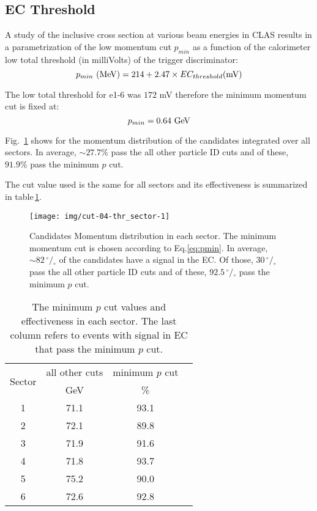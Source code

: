 \clearpage\newpage

\subsection{EC Threshold}
A study \cite{bib:ecmin} of the inclusive cross section at various beam energies in CLAS
results in a parametrization of the low momentum cut $p_{min}$ as a function of
the calorimeter low total threshold (in milliVolts) of the trigger discriminator:
\begin{equation}
    \label{eq:pmin}
    p_{min}\,\,{\rm (MeV)} = 214 + 2.47\times EC_{threshold}{\rm (mV)}
\end{equation}

The low total threshold for e1-6 was $172$ mV therefore the minimum momentum cut is fixed at:
$$
p_{min} = 0.64\,\,{\rm GeV}
$$

Fig.~\ref{fig:pmincut_alls} shows for the momentum distribution of the candidates integrated
over all sectors. In average, $\sim 27.7\%$  pass the all other particle ID
cuts and of these, $91.9\%$ pass the minimum $p$ cut.

The cut value used is the same for all sectors and its effectiveness is summarized in
table\,\ref{tab:pmincut}.


\begin{figure}[ht]
    \centering
    \texttt{[image: img/cut-04-thr\_sector-1]}
    \caption{Candidates Momentum distribution in each sector. The minimum momentum cut is
    chosen according to Eq.\ref{eq:pmin}. In average, $\sim 82 \,^{\circ\!\!}/\!_\circ$
        of the candidates have a signal in the EC. Of those, $30 \,^{\circ\!\!}/\!_\circ$
        pass the all other particle ID cuts and of these, $92.5 \,^{\circ\!\!}/\!_\circ$
        pass the minimum $p$ cut.}
    \label{fig:pmincut_alls}
\end{figure}


\begin{table}[h]
    \label{tab:pmincut}
    \begin{center}
        \begin{tabular}{c | c | c | c}
            \hline
            \multirow{2}{*}{Sector}
            & all other cuts & minimum $p$ cut \\
            & GeV & \% & \\
            \hline
            1 & 71.1 & 93.1 \\
            2 & 72.1 & 89.8 \\
            3 & 71.9 & 91.6 \\
            4 & 71.8 & 93.7 \\
            5 & 75.2 & 90.0 \\
            6 & 72.6 & 92.8 \\
            \hline
        \end{tabular}
        \caption{The minimum $p$ cut values and effectiveness in each sector.
        The last column refers to events with signal in EC that pass the
        minimum $p$ cut.}

    \end{center}
\end{table}


